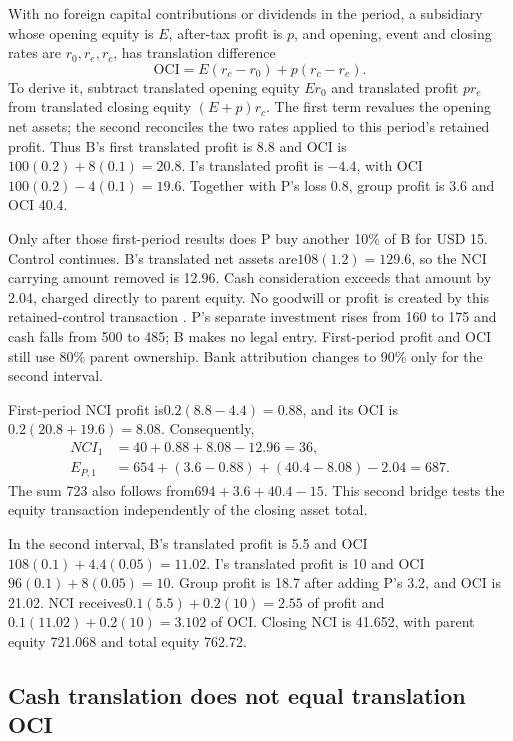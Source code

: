 With no foreign capital contributions or dividends in the period, a subsidiary
whose opening equity is \(E\), after-tax profit is \(p\), and opening,
event and closing rates are \(r_0,r_e,r_c\), has translation difference
\begin{equation}
 \mathrm{OCI}=E(r_c-r_0)+p(r_c-r_e).
 \label{eq:sector-translation-origin}
\end{equation}
To derive it, subtract translated opening equity \(Er_0\) and translated
profit \(pr_e\) from translated closing equity \((E+p)r_c\).
The first term revalues the opening net assets; the second reconciles the
two rates applied to this period's retained profit. Thus B's first translated
profit is 8.8 and OCI is\(100(0.2)+8(0.1)=20.8\). I's translated profit is
\(-4.4\), with OCI\(100(0.2)-4(0.1)=19.6\). Together with P's loss 0.8,
group profit is 3.6 and OCI 40.4.

Only after those first-period results does P buy another 10\% of B for USD 15.
Control continues. B's translated net assets are\(108(1.2)=129.6\), so the
NCI carrying amount removed is 12.96. Cash consideration exceeds that amount
by 2.04, charged directly to parent equity. No goodwill or profit is created
by this retained-control transaction \citep[IFRS~10.23,B 96]{eu20231803}.
P's separate investment rises from 160 to 175 and cash falls from 500 to 485;
B makes no legal entry. First-period profit and OCI still use 80\% parent
ownership. Bank attribution changes to 90\% only for the second interval.

First-period NCI profit is\(0.2(8.8-4.4)=0.88\), and its OCI is
\(0.2(20.8+19.6)=8.08\). Consequently,
\begin{align}
 NCI_1&=40+0.88+8.08-12.96=36,\\
 E_{P,1}&=654+(3.6-0.88)+(40.4-8.08)-2.04=687.
\end{align}
The sum 723 also follows from\(694+3.6+40.4-15\). This second bridge tests
the equity transaction independently of the closing asset total.

In the second interval, B's translated profit is 5.5 and OCI
\(108(0.1)+4.4(0.05)=11.02\). I's translated profit is 10 and OCI
\(96(0.1)+8(0.05)=10\). Group profit is 18.7 after adding P's 3.2, and
OCI is 21.02. NCI receives\(0.1(5.5)+0.2(10)=2.55\) of profit and
\(0.1(11.02)+0.2(10)=3.102\) of OCI. Closing NCI is 41.652, with parent
equity 721.068 and total equity 762.72.

\subsection{Cash translation does not equal translation OCI}

